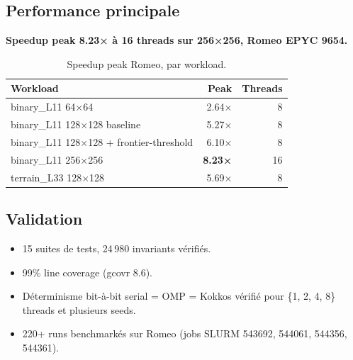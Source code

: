 \subsection{Performance principale}

\textbf{Speedup peak 8.23× à 16 threads sur 256×256, Romeo EPYC 9654.}

\begin{table}[H]
\centering
\begin{tabular}{lrr}
\toprule
\textbf{Workload} & \textbf{Peak} & \textbf{Threads} \\
\midrule
binary\_L11 64×64 & 2.64× & 8 \\
binary\_L11 128×128 baseline & 5.27× & 8 \\
binary\_L11 128×128 + frontier-threshold & 6.10× & 8 \\
binary\_L11 256×256 & \textbf{8.23×} & 16 \\
terrain\_L33 128×128 & 5.69× & 8 \\
\bottomrule
\end{tabular}
\caption{Speedup peak Romeo, par workload.}
\label{tab:concl:peak}
\end{table}

\subsection{Validation}

\begin{itemize}
    \item 15 suites de tests, 24\,980 invariants vérifiés.
    \item 99\% line coverage (gcovr 8.6).
    \item Déterminisme bit-à-bit serial = OMP = Kokkos vérifié pour \{1, 2, 4, 8\} threads et plusieurs seeds.
    \item 220+ runs benchmarkés sur Romeo (jobs SLURM 543692, 544061, 544356, 544361).
\end{itemize}
